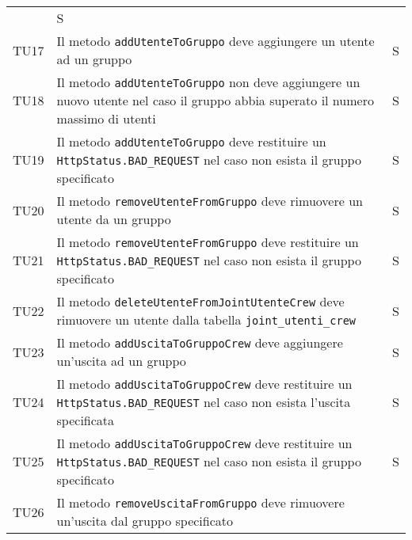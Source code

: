 \begin{center}
{\begin{longtable}{
      |>{\centering\arraybackslash}p{48pt}
      |>{\centering\arraybackslash}p{308pt}
      |>{\centering\arraybackslash}p{27pt}|}
                  & S                                              \\
      TU17
                  & Il metodo
      \texttt{addUtenteToGruppo} deve aggiungere un utente ad un gruppo
                  & S                                              \\
      TU18
                  & Il metodo
      \texttt{addUtenteToGruppo} non deve aggiungere un nuovo utente nel caso
      il
      gruppo abbia superato il numero massimo di utenti
                  & S                                              \\
      TU19
                  & Il metodo
      \texttt{addUtenteToGruppo} deve restituire un \texttt{
        HttpStatus.BAD\_REQUEST}
      nel caso non esista il gruppo specificato
                  & S                                              \\
      TU20
                  & Il metodo
      \texttt{removeUtenteFromGruppo} deve rimuovere un utente da un gruppo
                  & S                                              \\
      TU21
                  & Il metodo
      \texttt{removeUtenteFromGruppo} deve restituire un \texttt{
        HttpStatus.BAD\_REQUEST} nel caso non esista il gruppo specificato
                  & S                                              \\
      TU22
                  & Il metodo
      \texttt{deleteUtenteFromJointUtenteCrew} deve rimuovere un utente dalla
      tabella
      \texttt{joint\_utenti\_crew}
                  & S                                              \\
      TU23
                  & Il metodo
      \texttt{addUscitaToGruppoCrew} deve aggiungere un'uscita ad un gruppo
                  & S                                              \\
      TU24
                  & Il metodo
      \texttt{addUscitaToGruppoCrew}	deve restituire un
      \texttt{HttpStatus.BAD\_REQUEST} nel caso non esista l'uscita specificata
                  &
      S
      \\
      TU25
                  & Il metodo
      \texttt{addUscitaToGruppoCrew} deve restituire un
      \texttt{HttpStatus.BAD\_REQUEST} nel caso non esista il gruppo
      specificato &
      S
      \\
      TU26
                  & Il metodo
      \texttt{removeUscitaFromGruppo} deve rimuovere un'uscita dal gruppo
      specificato


\end{longtable}}
\end{center}
